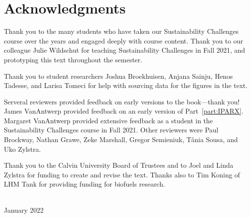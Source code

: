 

\chapter*{Acknowledgments}

\thispagestyle{plain}

\noindent
Thank you to the many students who have taken our Sustainability Challenges course 
over the years and engaged deeply with course content.
Thank you to our colleague Julie Wildschut for teaching Sustainability Challenges in Fall 2021,
and prototyping this text throughout the semester.

Thank you to student researchers Joshua Broekhuisen, Anjana Sainju, 
Henos Tadesse, and Larisa Tomeci
for help with sourcing data for the figures in the text. 

Serveral reviewers provided feedback on early versions to the book---thank you!
James VanAntwerp provided feedback on an early version of Part~\ref{part:IPARX}.
Margaret VanAntwerp provided extensive feedback as a student in the
Sustainability Challenges course in Fall 2021.
Other reviewers were Paul Brockway, Nathan Grawe, Zeke Marshall,
Gregor Semieniuk, T\^{a}nia Sousa, and Uko Zylstra.


Thank you to the Calvin University Board of Trustees and 
to Joel and Linda Zylstra
for funding to create and revise the text.
Thanks also to Tim Koning of LHM Tank for providing funding for biofuels research.



\vspace*{2pc}
\noindent\AUTHORS\\
\noindent January 2022